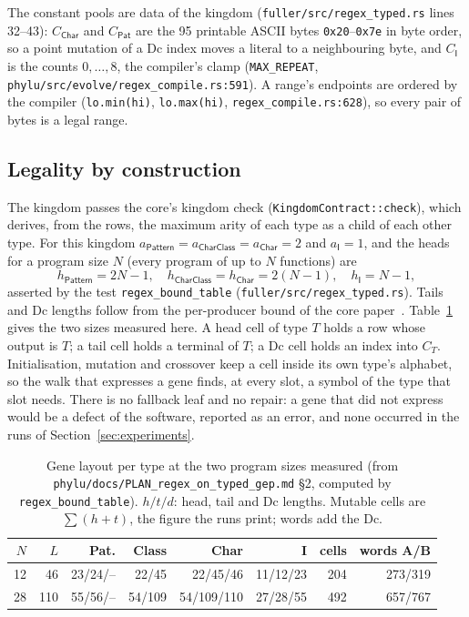 \documentclass[sigconf,nonacm]{acmart}
\newcommand{\ty}[1]{\textsf{#1}}
\newcommand{\src}[1]{{\small\nolinkurl{#1}}}
\begin{document}
The constant pools are data of the kingdom
(\src{fuller/src/regex_typed.rs} lines 32--43): $C_{\ty{Char}}$ and
$C_{\ty{Pat}}$ are the 95 printable ASCII bytes \texttt{0x20}--\texttt{0x7e} in
byte order, so a point mutation of a Dc index moves a literal to a neighbouring
byte, and $C_{\ty{I}}$ is the counts $0,\dots,8$, the compiler's clamp
(\src{MAX_REPEAT}, \src{phylu/src/evolve/regex_compile.rs:591}). A range's
endpoints are ordered by the compiler (\texttt{lo.min(hi)}, \texttt{lo.max(hi)},
\src{regex_compile.rs:628}), so every pair of bytes is a legal range.

\subsection{Legality by construction}

The kingdom passes the core's kingdom check (\src{KingdomContract::check}),
which derives, from the rows, the maximum arity of each type as a child of each
other type. For this kingdom
$a_{\ty{Pattern}}=a_{\ty{CharClass}}=a_{\ty{Char}}=2$ and $a_{\ty{I}}=1$, and the
heads for a program size $N$ (every program of up to $N$ functions) are
\[
h_{\ty{Pattern}}=2N-1,\quad h_{\ty{CharClass}}=h_{\ty{Char}}=2(N-1),\quad h_{\ty{I}}=N-1,
\]
asserted by the test \src{regex_bound_table} (\src{fuller/src/regex_typed.rs}).
Tails and Dc lengths follow from the per-producer bound of the core
paper~\cite{morgan_core}. Table~\ref{tab:layout} gives the two sizes measured
here. A head cell of type $T$ holds a row whose output is $T$; a tail cell holds a
terminal of $T$; a Dc cell holds an index into $C_T$. Initialisation, mutation
and crossover keep a cell inside its own type's alphabet, so the walk that
expresses a gene finds, at every slot, a symbol of the type that slot needs.
There is no fallback leaf and no repair: a gene that did not express would be a
defect of the software, reported as an error, and none occurred in the runs of
Section~\ref{sec:experiments}.

\begin{table}[t]
\caption{Gene layout per type at the two program sizes measured (from
\src{phylu/docs/PLAN_regex_on_typed_gep.md} \S2, computed by
\src{regex_bound_table}). $h/t/d$: head, tail and Dc lengths. Mutable
cells are $\sum (h+t)$, the figure the runs print; words add the Dc.}
\label{tab:layout}
\footnotesize
\setlength{\tabcolsep}{3pt}
\begin{tabular}{@{}rrrrrrrr@{}}
\toprule
$N$ & $L$ & Pat. & Class & Char & I & cells & words A/B \\
\midrule
12 & 46 & 23/24/-- & 22/45 & 22/45/46 & 11/12/23 & 204 & 273/319 \\
28 & 110 & 55/56/-- & 54/109 & 54/109/110 & 27/28/55 & 492 & 657/767 \\
\bottomrule
\end{tabular}
\end{table}
\end{document}
